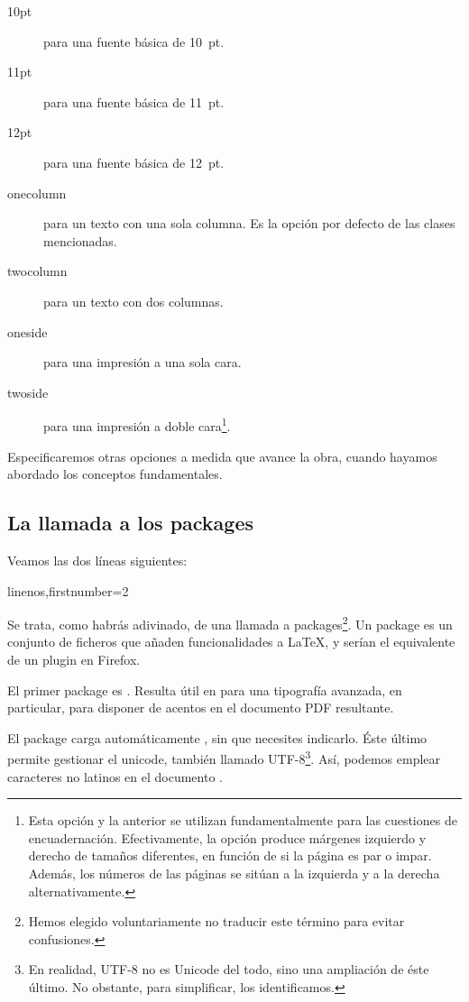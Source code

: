 \begin{description}
\item[10pt] para una fuente básica de 10~pt.
\item[11pt] para una fuente básica de 11~pt.
\item[12pt] para una fuente básica de 12~pt.
\item[onecolumn] para un texto con una sola columna. Es la opción por defecto de las clases mencionadas.
\item[twocolumn] para un texto con dos columnas.
\item[oneside] para una impresión a una sola cara. \label{nbsides}
\item[twoside] para una impresión a doble cara\footnote{Esta opción y la anterior se utilizan fundamentalmente para las cuestiones de encuadernación. Efectivamente, la opción  produce márgenes izquierdo y derecho de tamaños diferentes, en función de si la página es par o impar. Además, los números de las páginas se sitúan a la izquierda y a la derecha alternativamente.}.\label{rectoverso}
\end{description}

Especificaremos otras opciones a medida que avance la obra, cuando hayamos abordado los conceptos fundamentales.

\subsection{La llamada a los packages}

Veamos las dos líneas siguientes: 

\begin{latexcode*}{linenos,firstnumber=2}
\usepackage{fontspec}
\usepackage{polyglossia}
\end{latexcode*}

Se trata, como habrás adivinado, de una llamada a packages\footnote{Hemos elegido voluntariamente no traducir este término para evitar confusiones.}. Un package es un conjunto de ficheros que añaden funcionalidades a \LaTeX, y serían el equivalente de un  plugin en Firefox. 

El primer package es . Resulta útil en \XeLaTeX  para una tipografía avanzada, en particular, para disponer de acentos en el documento PDF resultante. 

El package  carga automáticamente , sin que necesites indicarlo. Éste último permite gestionar el unicode, también llamado UTF-8\footnote{En realidad, UTF-8 no es Unicode del todo, sino una ampliación de éste último. No obstante, para simplificar, los identificamos.}. Así, podemos emplear caracteres no latinos en el documento .

